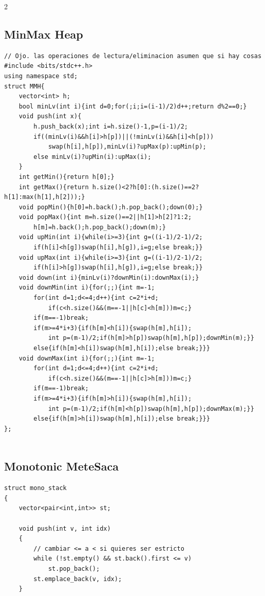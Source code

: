 \documentclass[twoside]{article}
\begin{document}
\begin{multicols*}{2}
{		\subsection*{MinMax Heap}
	}
	\begin{verbatim}
// Ojo. las operaciones de lectura/eliminacion asumen que si hay cosas
#include <bits/stdc++.h>
using namespace std;
struct MMH{
    vector<int> h;
    bool minLv(int i){int d=0;for(;i;i=(i-1)/2)d++;return d%2==0;}
    void push(int x){
        h.push_back(x);int i=h.size()-1,p=(i-1)/2;
        if((minLv(i)&&h[i]>h[p])||(!minLv(i)&&h[i]<h[p]))
            swap(h[i],h[p]),minLv(i)?upMax(p):upMin(p);
        else minLv(i)?upMin(i):upMax(i);
    }
    int getMin(){return h[0];}
    int getMax(){return h.size()<2?h[0]:(h.size()==2?h[1]:max(h[1],h[2]));}
    void popMin(){h[0]=h.back();h.pop_back();down(0);}
    void popMax(){int m=h.size()==2||h[1]>h[2]?1:2;
        h[m]=h.back();h.pop_back();down(m);}
    void upMin(int i){while(i>=3){int g=((i-1)/2-1)/2;
        if(h[i]<h[g])swap(h[i],h[g]),i=g;else break;}}
    void upMax(int i){while(i>=3){int g=((i-1)/2-1)/2;
        if(h[i]>h[g])swap(h[i],h[g]),i=g;else break;}}
    void down(int i){minLv(i)?downMin(i):downMax(i);}
    void downMin(int i){for(;;){int m=-1;
        for(int d=1;d<=4;d++){int c=2*i+d;
            if(c<h.size()&&(m==-1||h[c]<h[m]))m=c;}
        if(m==-1)break;
        if(m>=4*i+3){if(h[m]<h[i]){swap(h[m],h[i]);
            int p=(m-1)/2;if(h[m]>h[p])swap(h[m],h[p]);downMin(m);}}
        else{if(h[m]<h[i])swap(h[m],h[i]);else break;}}}
    void downMax(int i){for(;;){int m=-1;
        for(int d=1;d<=4;d++){int c=2*i+d;
            if(c<h.size()&&(m==-1||h[c]>h[m]))m=c;}
        if(m==-1)break;
        if(m>=4*i+3){if(h[m]>h[i]){swap(h[m],h[i]);
            int p=(m-1)/2;if(h[m]<h[p])swap(h[m],h[p]);downMax(m);}}
        else{if(h[m]>h[i])swap(h[m],h[i]);else break;}}}
};


\end{verbatim}

	{
		\subsection*{Monotonic MeteSaca}
	}
	\begin{verbatim}
struct mono_stack
{
    vector<pair<int,int>> st;

    void push(int v, int idx)
    {
        // cambiar <= a < si quieres ser estricto
        while (!st.empty() && st.back().first <= v)
            st.pop_back();
        st.emplace_back(v, idx);
    }


\end{verbatim}
\end{multicols*}
\end{document}
